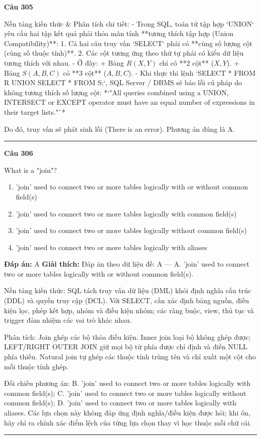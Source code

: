 \documentclass[11pt,a4paper]{article}
\newenvironment{question}[1]{%
  \par\vspace{1em}\noindent\textbf{\large Câu #1}\par\vspace{0.4em}
}{%
  \par\vspace{1em}\hrule\vspace{0.6em}
}
\newenvironment{choices}{%
  \begin{enumerate}[label=\textbf{\Alph*.},leftmargin=2.2em,itemsep=2pt,topsep=3pt]
}{%
  \end{enumerate}
}
\newcommand{\choice}{\item}
\begin{document}
\begin{question}{305}
Nền tảng kiến thức & Phân tích chi tiết:
- Trong SQL, toán tử tập hợp `UNION` yêu cầu hai tập kết quả phải thỏa mãn tính **tương thích tập hợp (Union Compatibility)**:
  1. Cả hai câu truy vấn `SELECT` phải có **cùng số lượng cột (cùng số thuộc tính)**.
  2. Các cột tương ứng theo thứ tự phải có kiểu dữ liệu tương thích với nhau.
- Ở đây:
  + Bảng \(R(X, Y)\) chỉ có **2 cột** (\(X, Y\)).
  + Bảng \(S(A, B, C)\) có **3 cột** (\(A, B, C\)).
- Khi thực thi lệnh `SELECT * FROM R UNION SELECT * FROM S;`, SQL Server / DBMS sẽ báo lỗi cú pháp do không tương thích số lượng cột:
  *`"All queries combined using a UNION, INTERSECT or EXCEPT operator must have an equal number of expressions in their target lists."`*

Do đó, truy vấn sẽ phát sinh lỗi (There is an error). Phương án đúng là A.
\end{question}

\begin{question}{306}
What is a "join"?
\begin{choices}
\choice 'join' used to connect two or more tables logically with or without common field(s)
\choice 'join' used to connect two or more tables logically with common field(s)
\choice 'join' used to connect two or more tables logically without common field(s)
\choice 'join' used to connect two or more tables logically with aliases
\end{choices}
\textbf{Đáp án:} A
\textbf{Giải thích:} Đáp án theo dữ liệu đề: A — A. 'join' used to connect two or more tables logically with or without common field(s).

Nền tảng kiến thức: SQL tách truy vấn dữ liệu (DML) khỏi định nghĩa cấu trúc (DDL) và quyền truy cập (DCL). Với SELECT, cần xác định bảng nguồn, điều kiện lọc, phép kết hợp, nhóm và điều kiện nhóm; các ràng buộc, view, thủ tục và trigger đảm nhiệm các vai trò khác nhau.

Phân tích: Join ghép các bộ thỏa điều kiện. Inner join loại bộ không ghép được; LEFT/RIGHT OUTER JOIN giữ mọi bộ từ phía được chỉ định và điền NULL phía thiếu. Natural join tự ghép các thuộc tính trùng tên và chỉ xuất một cột cho mỗi thuộc tính ghép.

Đối chiếu phương án: B. 'join' used to connect two or more tables logically with common field(s); C. 'join' used to connect two or more tables logically without common field(s); D. 'join' used to connect two or more tables logically with aliases. Các lựa chọn này không đáp ứng định nghĩa/điều kiện được hỏi; khi ôn, hãy chỉ ra chính xác điểm lệch của từng lựa chọn thay vì học thuộc mỗi chữ cái.
\end{question}
\end{document}
